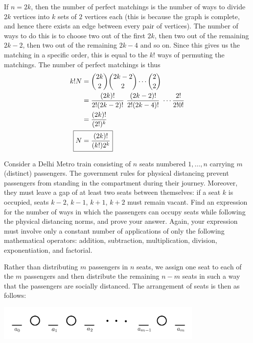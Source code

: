 \documentclass[12pt,answers]{exam}
\begin{document}
\begin{questions}
\begin{solution}
If $n = 2k$, then the number of perfect matchings is the number of ways to divide $2k$ vertices into $k$ sets of $2$ vertices each (this is because the graph is complete, and hence there exists an edge between every pair of vertices). The number of ways to do this is to choose two out of the first $2k$, then two out of the remaining $2k-2$, then two out of the remaining $2k - 4$ and so on. Since this gives us the matching in a specific order, this is equal to the $k!$ ways of permuting the matchings. The number of perfect matchings is thus 
\begin{align*}
    k! N &= \binom{2k}{2}\binom{2k-2}{2}\cdots\binom{2}{2} \\
      &= \frac{(2k)!}{2!(2k-2)!}\ \frac{(2k-2)!}{2!(2k-4)!}\ \cdots \frac{2!}{2!0!} \\
      &= \frac{(2k)!}{(2!)^k} \\
    \Aboxed{N &= \frac{(2k)!}{(k!)2^k}}
\end{align*}
\end{solution}

\question Consider a Delhi Metro train consisting of $n$ seats numbered $1,\ldots,n$ carrying $m$ (distinct) passengers. The government rules for physical distancing prevent passengers from standing in the compartment during their journey. Moreover, they must leave a gap of at least two seats between themselves: if a seat $k$ is occupied, seats $k-2$, $k-1$, $k+1$, $k+2$ must remain vacant. Find an expression for the number of ways in which the passengers can occupy seats while following the physical distancing norms, and prove your answer. Again, your expression must involve only a constant number of applications of only the following mathematical operators: addition, subtraction, multiplication, division, exponentiation, and factorial.
\begin{solution}
Rather than distributing $m$ passengers in $n$ seats, we assign one seat to each of the $m$ passengers and then distribute the remaining $n-m$ seats in such a way that the passengers are socially distanced. The arrangement of seats is then as follows:

\begin{center}
\includegraphics[width=4in]{seats.png}
\end{center}


\end{solution}
\end{questions}
\end{document}
